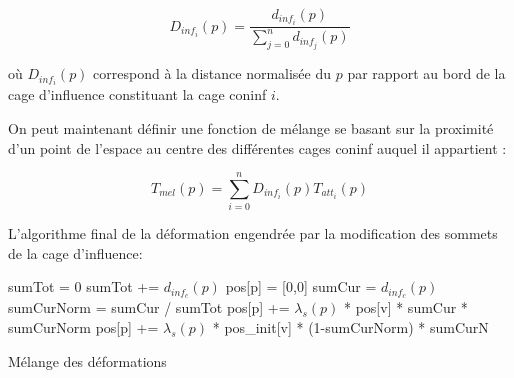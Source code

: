 \begin{displaymath}
  D_{inf_i}(p) = \frac{d_{inf_i}(p)}{\sum_{j=0}^n d_{inf_j}(p)}
\end{displaymath}

où $D_{inf_i}(p)$ correspond à la distance normalisée du $p$ par rapport au
bord de la cage d'influence constituant la cage coninf $i$.

On peut maintenant définir une fonction de mélange se basant sur la proximité
d'un point de l'espace au centre des différentes cages coninf auquel il
appartient :

\begin{displaymath}
  T_{mel}(p) = \sum_{i=0}^n D_{inf_i}(p) T_{att_i}(p)
\end{displaymath}

L'algorithme final de la déformation engendrée par la modification des sommets
de la cage d'influence: \\

\begin{algorithm}[H]
{
  sumTot = 0\;
  {
    sumTot += $d_{inf_c}(p)$\;
  }
  pos[p] = [0,0]\; 
  {
    sumCur = $d_{inf_c}(p)$\;
    sumCurNorm = sumCur / sumTot\;
    {
      pos[p] += $\lambda_s(p)$ * pos[v] * sumCur * sumCurNorm\;
      pos[p] += $\lambda_s(p)$ * pos\_init[v] * (1-sumCurNorm) * sumCurN\;
    }
  }
}
\caption{Mélange des déformations}
\end{algorithm}

